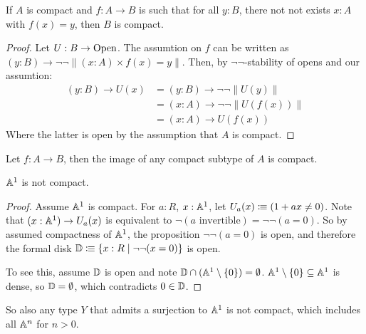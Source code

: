 \begin{lemma}
  \label{not-not-surjection-compact}
  If $A$ is compact and $f:A\to B$ is such that for all $y:B$,
  there not not exists $x:A$ with $f(x)=y$,
  then $B$ is compact.
\end{lemma}

\begin{proof}
  Let $U:B\to\mathrm{Open}$.
  The assumtion on $f$ can be written as $(y:B)\to \neg\neg \| (x:A)\times f(x)=y \|$.
  Then, by $\neg\neg$-stability of opens and our assumtion:
  \begin{align*}
    (y:B)\to U(x) &= (y:B)\to \neg\neg \| U(y) \| \\
                  &= (x:A)\to \neg\neg \| U(f(x)) \| \\
                  &= (x:A)\to U(f(x))
  \end{align*}
  Where the latter is open by the assumption that $A$ is compact.
\end{proof}

\begin{corollary}
  \label{image-compact}
  Let $f:A\to B$, then the image of any compact subtype of $A$ is compact.
\end{corollary}

\begin{proposition}
  $\mathbb{A}^1$ is not compact.
\end{proposition}

\begin{proof}
  Assume $\mathbb{A}^1$ is compact.
  For $a:R$, $x:\mathbb{A}^1$, let $U_a(x)\vcentcolon\mspace{-1.2mu}\equiv (1+ax \neq 0)$.
  Note that $(x:\mathbb{A}^1)\to U_a(x)$ is equivalent to $\neg(\text{$a$ invertible})=\neg\neg(a=0)$.
  So by assumed compactness of $\mathbb{A}^1$, the proposition $\neg\neg(a=0)$ is open,
  and therefore the formal disk $\mathbb{D}\vcentcolon\mspace{-1.2mu}\equiv \{x:R\mid \neg\neg(x=0)\}$ is open.

  To see this, assume $\mathbb{D}$ is open and note $\mathbb{D}\cap (\mathbb{A}^1\setminus\{0\})=\emptyset$.
  $\mathbb{A}^1\setminus\{0\}\subseteq \mathbb{A}^1$ is dense, so $\mathbb{D}=\emptyset$, which contradicts $0\in\mathbb{D}$.
\end{proof}

So also any type $Y$ that admits a surjection to $\mathbb{A}^1$ is not compact, which includes all $\mathbb{A}^n$ for $n>0$.